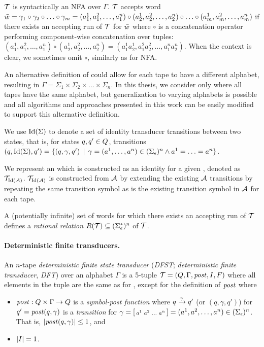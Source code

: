 \nft $\mathcal{T}$ is syntactically an NFA over $\Gamma$.
$\mathcal{T}$ accepts word $\bar{{w}} = \gamma_1 \circ \gamma_2 \circ \ldots \circ \gamma_m = (a^1_1, a^2_1, \ldots, a^n_1) \circ (a^1_2, a^2_2, \ldots, a^n_2) \circ \ldots \circ (a^1_m, a^2_m, \ldots, a^n_m) $
 if there exists an accepting run of $\mathcal{T}$ for $\bar{{w}}$ where $\circ$ is a concatenation operator performing component-wise concatenation over tuples:
$(a^1_1, a^2_1, \ldots, a^n_1) \circ (a^1_2, a^2_2, \ldots, a^n_2) = (a^1_1a^1_2, a^2_1a^2_2, \ldots, a^n_1a^n_2)$.
When the context is clear, we sometimes omit $\circ$, similarly as for NFA.

An alternative definition of \nfts could allow for each tape to have a different alphabet, resulting in $\Gamma = \Sigma_1 \times \Sigma_2 \times \ldots \times \Sigma_n$.
In this thesis, we consider only \nfts where all tapes have the same alphabet, but generalization to varying alphabets is possible and all algorithms and approaches presented in this work can be easily modified to support this alternative definition.

We use $\text{Id}(\Sigma)$ to denote a set of identity transducer transitions between two states, that is, for states $q, q' \in Q$, transitions
$(q, \text{Id}(\Sigma), q') = \{ (q, \gamma, q') \,\mid\, \gamma = (a^1, \ldots, a^n) \in (\Sigma_\epsilon)^n \land a^1 = \ldots = a^n \}$.

We represent an \nft which is constructed as an identity \nft for a given \nfa, denoted as $\mathcal{T}_{\text{Id}(\mathcal{A})}$.
$\mathcal{T}_{\text{Id}(\mathcal{A})}$ is constructed from $\mathcal{A}$ by extending the existing $\mathcal{A}$ transitions by repeating the same transition symbol as is the existing transition symbol in $\mathcal{A}$ for each tape.

A (potentially infinite) set of words for which there exists an accepting run of $\mathcal{T}$ defines a \emph{rational relation} $R(\mathcal{T}) \subseteq (\Sigma_\epsilon^*)^n$ of \nft $\mathcal{T}$.

\paragraph{Deterministic finite transducers.}
An $n$-tape \emph{deterministic finite state transducer} (\emph{DFST}; \emph{deterministic finite transducer}, \emph{DFT}) over an alphabet $\Gamma$ is a 5-tuple $\mathcal{T} = (Q, \Gamma, \mathit{post}, I, F)$ where all elements in the tuple are the same as for \nft, except for the definition of $\mathit{post}$ where
\begin{itemize}
    \item $\mathit{post}: Q \times \Gamma \rightarrow Q$ is a \emph{symbol-post function} where ${q} \xrightarrow{{\gamma}} {q'}$ (or $(q, \gamma, q')$) for $q' = \mathit{post}(q, \gamma)$ is a \emph{transition} for $\gamma = \begin{bsmallmatrix} a^1 & a^2 & \ldots & a^n\end{bsmallmatrix} = (a^1, a^2, \ldots, a^n) \in (\Sigma_\epsilon)^n$. That is, $|\mathit{post}(q, \gamma)| \leq 1$, and
    \item $|I| = 1$.
\end{itemize}

